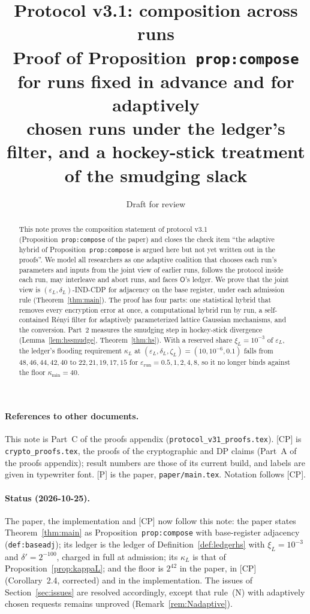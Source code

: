 \documentclass[11pt]{article}
\title{\textbf{Protocol v3.1: composition across runs}\\[4pt]
\large Proof of Proposition~\texttt{prop:compose} for runs fixed in advance and for adaptively\\ chosen runs under the ledger's filter, and a hockey-stick treatment of the smudging slack}
\date{Draft for review}
\theoremstyle{definition}
\theoremstyle{plain}
\newcommand{\Op}{\mathsf{O}}
\newcommand{\CP}{\textup{[CP]}}
\newcommand{\Pp}{\textup{[P]}}
\begin{document}
\maketitle

\begin{abstract}
\noindent
This note proves the composition statement of protocol v3.1 (Proposition~\texttt{prop:compose} of the paper) and closes the check item ``the adaptive hybrid of Proposition~\texttt{prop:compose} is argued here but not yet written out in the proofs''. We model all researchers as one adaptive coalition that chooses each run's parameters and inputs from the joint view of earlier runs, follows the protocol inside each run, may interleave and abort runs, and faces $\Op$'s ledger. We prove that the joint view is $(\varepsilon_L,\delta_L)$-IND-CDP for adjacency on the base register, under each admission rule (Theorem~\ref{thm:main}). The proof has four parts: one statistical hybrid that removes every encryption error at once, a computational hybrid run by run, a self-contained R\'enyi filter for adaptively parameterized lattice Gaussian mechanisms, and the conversion. Part~2 measures the smudging step in hockey-stick divergence (Lemma~\ref{lem:hssmudge}, Theorem~\ref{thm:hs}). With a reserved share $\xi_L=10^{-3}$ of $\varepsilon_L$, the ledger's flooding requirement $\kappa_L$ at $(\varepsilon_L,\delta_L,\zeta_L)=(10,10^{-6},0.1)$ falls from $48,46,44,42,40$ to $22,21,19,17,15$ for $\varepsilon_{\mathrm{run}}=0.5,1,2,4,8$, so it no longer binds against the floor $\kappa_{\min}=40$.
\end{abstract}

\paragraph{References to other documents.} This note is Part~C of the proofs appendix (\texttt{protocol\_v31\_proofs.tex}). \CP{} is \texttt{crypto\_proofs.tex}, the proofs of the cryptographic and DP claims (Part~A of the proofs appendix); result numbers are those of its current build, and labels are given in typewriter font. \Pp{} is the paper, \texttt{paper/main.tex}. Notation follows \CP{}.

\paragraph{Status (2026-10-25).} The paper, the implementation and \CP{} now follow this note: the paper states Theorem~\ref{thm:main} as Proposition~\texttt{prop:compose} with base-register adjacency (\texttt{def:baseadj}); its ledger is the ledger of Definition~\ref{def:ledgerhs} with $\xi_L=10^{-3}$ and $\delta'=2^{-100}$, charged in full at admission; its $\kappa_L$ is that of Proposition~\ref{prop:kappaL}; and the floor is $2^{42}$ in the paper, in \CP{} (Corollary~2.4, corrected) and in the implementation. The issues of Section~\ref{sec:issues} are resolved accordingly, except that rule~(N) with adaptively chosen requests remains unproved (Remark~\ref{rem:Nadaptive}).
\end{document}
